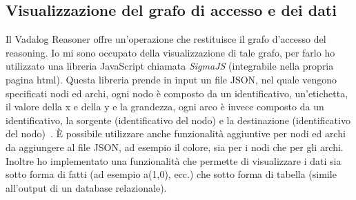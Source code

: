 \subsection{Visualizzazione del grafo di accesso e dei dati}

Il Vadalog Reasoner offre un'operazione che restituisce il grafo d'accesso del reasoning. Io mi sono occupato della visualizzazione di tale grafo, per farlo ho utilizzato una libreria JavaScript chiamata \emph{SigmaJS} (integrabile nella propria pagina html). Questa libreria prende in input un file JSON, nel quale vengono specificati nodi ed archi, ogni nodo è composto da un identificativo, un'etichetta, il valore della x e della y e la grandezza, ogni arco è invece composto da un identificativo, la sorgente (identificativo del nodo) e la destinazione (identificativo del nodo)~\cite{SIGMAJS}. È possibile utilizzare anche funzionalità aggiuntive per nodi ed archi da aggiungere al file JSON, ad esempio il colore, sia per i nodi che per gli archi. \newline
Inoltre ho implementato una funzionalità che permette di visualizzare i dati sia sotto forma di fatti (ad esempio a(1,0), ecc.) che sotto forma di tabella (simile all'output di un database relazionale).
